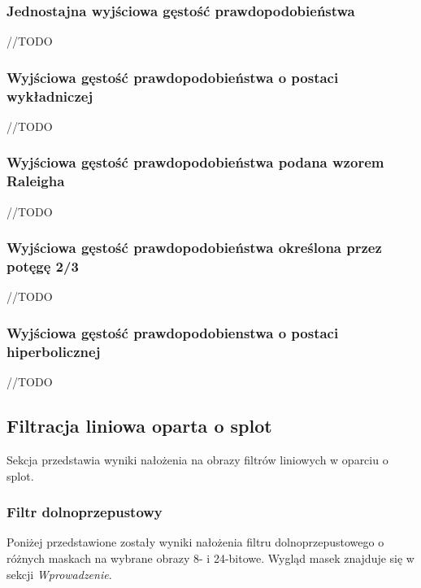 \documentclass{classrep}
\begin{document}
\subsubsection{Jednostajna wyjściowa gęstość prawdopodobieństwa}
//TODO

\subsubsection{Wyjściowa gęstość prawdopodobieństwa o postaci wykładniczej}
//TODO

\subsubsection{Wyjściowa gęstość prawdopodobieństwa podana wzorem Raleigha}
//TODO

\subsubsection{Wyjściowa gęstość prawdopodobieństwa określona przez potęgę 2/3}
//TODO

\subsubsection{Wyjściowa gęstość prawdopodobienstwa o postaci hiperbolicznej}
//TODO

\subsection{Filtracja liniowa oparta o splot}
Sekcja przedstawia wyniki nałożenia na obrazy filtrów liniowych w oparciu o splot.

\subsubsection{Filtr dolnoprzepustowy}
Poniżej przedstawione zostały wyniki nałożenia filtru dolnoprzepustowego o różnych maskach na wybrane obrazy 8- i 24-bitowe. Wygląd masek znajduje się w sekcji \textit{Wprowadzenie}.
\end{document}
